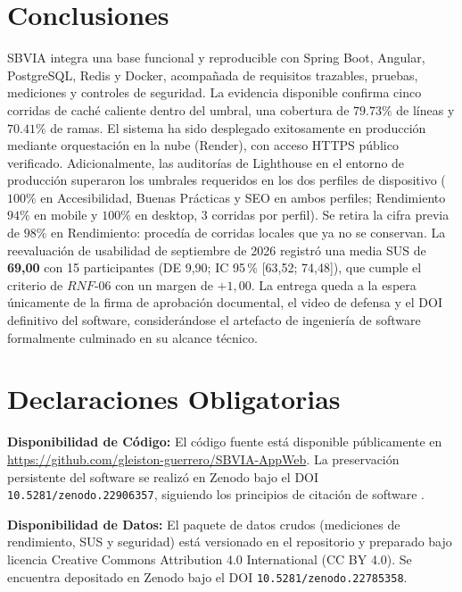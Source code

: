 \documentclass[11pt,a4paper]{report}
\begin{document}
\chapter{Conclusiones}
SBVIA integra una base funcional y reproducible con Spring Boot, Angular, PostgreSQL, Redis y Docker, acompañada de requisitos trazables, pruebas, mediciones y controles de seguridad. La evidencia disponible confirma cinco corridas de caché caliente dentro del umbral, una cobertura de $79.73\%$ de líneas y $70.41\%$ de ramas. El sistema ha sido desplegado exitosamente en producción mediante orquestación en la nube (Render), con acceso HTTPS público verificado. Adicionalmente, las auditorías de Lighthouse en el entorno de producción superaron los umbrales requeridos en los dos perfiles de dispositivo ($100\%$ en Accesibilidad, Buenas Prácticas y SEO en ambos perfiles; Rendimiento $94\%$ en mobile y $100\%$ en desktop, 3 corridas por perfil). Se retira la cifra previa de $98\%$ en Rendimiento: procedía de corridas locales que ya no se conservan. La reevaluación de usabilidad de septiembre de 2026 registró una media SUS de \textbf{69,00} con 15 participantes (DE 9,90; IC 95\,\% [63,52; 74,48]), que cumple el criterio de $RNF\text{-}06$ con un margen de $+1,00$. La entrega queda a la espera únicamente de la firma de aprobación documental, el video de defensa y el DOI definitivo del software, considerándose el artefacto de ingeniería de software formalmente culminado en su alcance técnico.

\chapter*{Declaraciones Obligatorias}

\textbf{Disponibilidad de Código:} El código fuente está disponible públicamente en \url{https://github.com/gleiston-guerrero/SBVIA-AppWeb}. La preservación persistente del software se realizó en Zenodo bajo el DOI \texttt{10.5281/zenodo.22906357}, siguiendo los principios de citación de software \cite{smith2016software}.

\textbf{Disponibilidad de Datos:} El paquete de datos crudos (mediciones de rendimiento, SUS y seguridad) está versionado en el repositorio y preparado bajo licencia Creative Commons Attribution 4.0 International (CC BY 4.0). Se encuentra depositado en Zenodo bajo el DOI \texttt{10.5281/zenodo.22785358}.
\end{document}
